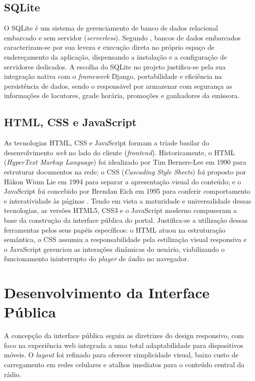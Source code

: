 \documentclass[12pt, openright, oneside, a4paper, brazil]{ads-unipac-abntex2}
\begin{document}
\subsection{SQLite}

O SQLite é um sistema de gerenciamento de banco de dados relacional embarcado e sem servidor (\textit{serverless}). Segundo , bancos de dados embarcados caracterizam-se por sua leveza e execução direta no próprio espaço de endereçamento da aplicação, dispensando a instalação e a configuração de servidores dedicados. A escolha do SQLite no projeto justifica-se pela sua integração nativa com o \textit{framework} Django, portabilidade e eficiência na persistência de dados, sendo o responsável por armazenar com segurança as informações de locutores, grade horária, promoções e ganhadores da emissora.

\subsection{HTML, CSS e JavaScript}

As tecnologias HTML, CSS e JavaScript formam a tríade basilar do desenvolvimento \textit{web} no lado do cliente (\textit{frontend}). Historicamente, o HTML (\textit{HyperText Markup Language}) foi idealizado por Tim Berners-Lee em 1990 para estruturar documentos na rede; o CSS (\textit{Cascading Style Sheets}) foi proposto por Håkon Wium Lie em 1994 para separar a apresentação visual do conteúdo; e o JavaScript foi concebido por Brendan Eich em 1995 para conferir comportamento e interatividade às páginas \cite{duckett}. Tendo em vista a maturidade e universalidade dessas tecnologias, as versões HTML5, CSS3 e o JavaScript moderno compuseram a base da construção da interface pública do portal. Justifica-se a utilização dessas ferramentas pelos seus papéis específicos: o HTML atuou na estruturação semântica, o CSS assumiu a responsabilidade pela estilização visual responsiva e o JavaScript gerenciou as interações dinâmicas do usuário, viabilizando o funcionamento ininterrupto do \textit{player} de áudio no navegador.

\section{Desenvolvimento da Interface Pública}

A concepção da interface pública seguiu as diretrizes do design responsivo, com foco na experiência web integrada a uma total adaptabilidade para dispositivos móveis. O \textit{layout} foi refinado para oferecer simplicidade visual, baixo custo de carregamento em redes celulares e atalhos imediatos para o conteúdo central da rádio.
\end{document}
